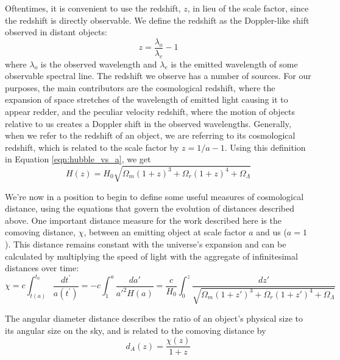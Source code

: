 Oftentimes, it is convenient to use the redshift, $z$, in lieu of the scale factor, since the redshift is directly observable. We define the redshift as the Doppler-like shift observed in distant objects:
\begin{equation}
    z = \frac{\lambda_o}{\lambda_e} - 1
    \label{eqn:z_def}
\end{equation}
where $\lambda_o$ is the observed wavelength and $\lambda_e$ is the emitted wavelength of some observable spectral line. The redshift we observe has a number of sources. For our purposes, the main contributors are the cosmological redshift, where the expansion of space stretches of the wavelength of emitted light causing it to appear redder, and the peculiar velocity redshift, where the motion of objects relative to us creates a Doppler shift in the observed wavelengths. Generally, when we refer to the redshift of an object, we are referring to its cosmological redshift, which is related to the scale factor by $z = 1/a - 1$. Using this definition in Equation \ref{eqn:hubble_vs_a}, we get
\begin{equation}
    H(z) = H_0\sqrt{\Omega_m (1+z)^{3} + \Omega_r (1+z)^{4} + \Omega_\Lambda}
\end{equation}

We're now in a position to begin to define some useful measures of cosmological distance, using the equations that govern the evolution of distances described above. One important distance measure for the work described here is the comoving distance, $\chi$, between an emitting object at scale factor $a$ and us ($a=1$). This distance remains constant with the universe's expansion and can be calculated by multiplying the speed of light with the aggregate of infinitesimal distances over time:
\begin{equation}
    \chi = c\displaystyle\int_{t(a)}^{t_0} \frac{dt^\prime}{a(t^\prime)}
    = -c\displaystyle\int_1^a \frac{da'}{a'^2 H(a)}
    = \frac{c}{H_0}\displaystyle\int_0^z \frac{dz'}{\sqrt{\Omega_m(1+z')^3 + \Omega_r(1+z')^4 + \Omega_\Lambda}}
\end{equation}

The angular diameter distance describes the ratio of an object's physical size to its angular size on the sky, and is related to the comoving distance by
$$d_A(z) = \frac{\chi(z)}{1+z}$$

